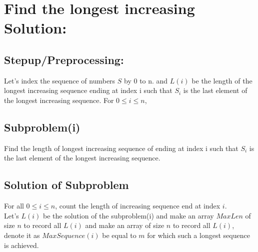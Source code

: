 \documentclass[a4paper]{scrartcl}
\begin{document}

\section{Find the longest increasing  Solution:}
  \subsection{Stepup/Preprocessing:}
  Let's index the sequence of numbers $S$ by 0 to n. and $L(i)$ be the length of the longest increasing sequence ending at index i such that $S_i$ is the last element of the longest increasing sequence.
  For $0 \leq i \leq n$,
  \subsection{Subproblem(i)} Find the length of longest increasing sequence of ending at index i  such that $S_i$ is the last element of the longest increasing sequence.
  \subsection{Solution of Subproblem} For all $ 0 \leq i \leq n$, count the length of increasing sequence end at index $i$.\\
   Let's $L(i)$ be the solution of the subproblem(i) and make an array $MaxLen$ of size $n$ to record all $L(i)$ and make an array of size $n$ to record all $L(i)$, denote it as $MaxSequence(i)$ be equal to $m$ for which such a longest sequence is achieved.
\end{document}
